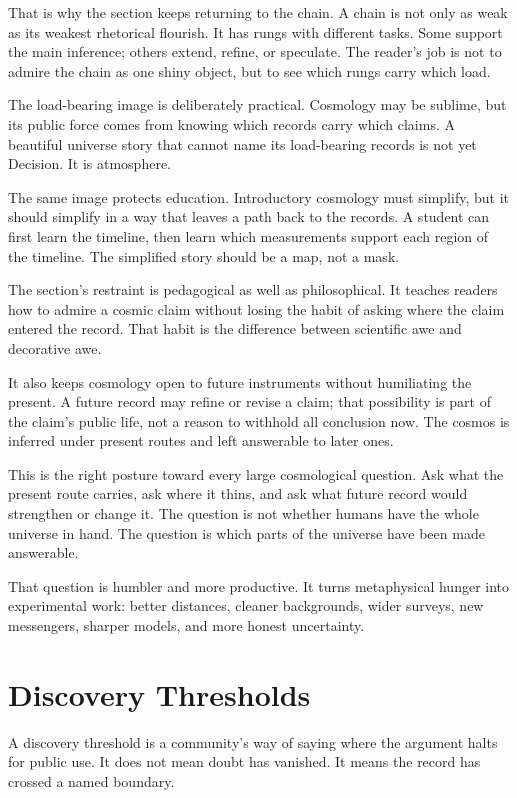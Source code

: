 That is why the section keeps returning to the chain. A chain is not only as
weak as its weakest rhetorical flourish. It has rungs with different tasks.
Some support the main inference; others extend, refine, or speculate. The
reader's job is not to admire the chain as one shiny object, but to see which
rungs carry which load.

The load-bearing image is deliberately practical. Cosmology may be sublime,
but its public force comes from knowing which records carry which claims. A
beautiful universe story that cannot name its load-bearing records is not yet
Decision. It is atmosphere.

The same image protects education. Introductory cosmology must simplify, but
it should simplify in a way that leaves a path back to the records. A student
can first learn the timeline, then learn which measurements support each
region of the timeline. The simplified story should be a map, not a mask.

The section's restraint is pedagogical as well as philosophical. It teaches
readers how to admire a cosmic claim without losing the habit of
asking where the claim entered the record. That habit is the difference
between scientific awe and decorative awe.

It also keeps cosmology open to future instruments without humiliating the
present. A future record may refine or revise a claim; that possibility is
part of the claim's public life, not a reason to withhold all conclusion now.
The cosmos is inferred under present routes and left answerable to later
ones.

This is the right posture toward every large cosmological question. Ask what
the present route carries, ask where it thins, and ask what future record
would strengthen or change it. The question is not whether humans have the
whole universe in hand. The question is which parts of the universe have been
made answerable.

That question is humbler and more productive. It turns metaphysical hunger
into experimental work: better distances, cleaner backgrounds, wider surveys,
new messengers, sharper models, and more honest uncertainty.

\section{Discovery Thresholds}

A discovery threshold is a community's way of saying where the argument halts
for public use. It does not mean doubt has vanished. It means the record has
crossed a named boundary.

